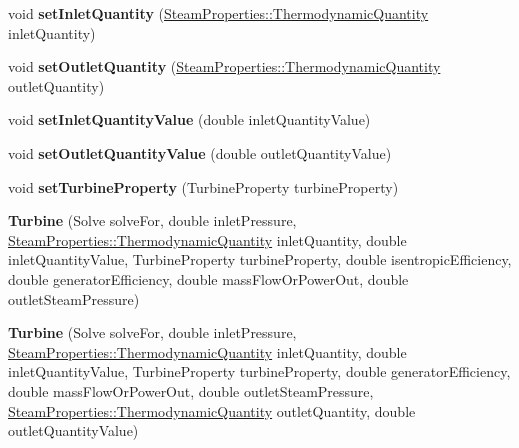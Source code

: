 \begin{DoxyCompactItemize}
\mbox{\label{class_turbine_aecc05c70870fb11bbc0bb4fe5d8438bd}} 
void {\bfseries set\+Inlet\+Quantity} (\hyperlink{class_steam_properties_ae0294bedf7d178c2d8fb6aed0f62fbff}{Steam\+Properties\+::\+Thermodynamic\+Quantity} inlet\+Quantity)
\item 
\mbox{\label{class_turbine_ad5ff4ba1657aac9519a6841336ec571c}} 
void {\bfseries set\+Outlet\+Quantity} (\hyperlink{class_steam_properties_ae0294bedf7d178c2d8fb6aed0f62fbff}{Steam\+Properties\+::\+Thermodynamic\+Quantity} outlet\+Quantity)
\item 
\mbox{\label{class_turbine_ac01a053462c83e21ecc2158e75477542}} 
void {\bfseries set\+Inlet\+Quantity\+Value} (double inlet\+Quantity\+Value)
\item 
\mbox{\label{class_turbine_ab37326068f633280de8f8144b9c8eb89}} 
void {\bfseries set\+Outlet\+Quantity\+Value} (double outlet\+Quantity\+Value)
\item 
\mbox{\label{class_turbine_abb3f16cefe52f4e9c7b32b2bb17a68ee}} 
void {\bfseries set\+Turbine\+Property} (Turbine\+Property turbine\+Property)
\item 
\mbox{\label{class_turbine_a3c3c871b9fe57d48dd06b109794381dc}} 
{\bfseries Turbine} (Solve solve\+For, double inlet\+Pressure, \hyperlink{class_steam_properties_ae0294bedf7d178c2d8fb6aed0f62fbff}{Steam\+Properties\+::\+Thermodynamic\+Quantity} inlet\+Quantity, double inlet\+Quantity\+Value, Turbine\+Property turbine\+Property, double isentropic\+Efficiency, double generator\+Efficiency, double mass\+Flow\+Or\+Power\+Out, double outlet\+Steam\+Pressure)
\item 
\mbox{\label{class_turbine_a1ec182906c075407882de542954d9030}} 
{\bfseries Turbine} (Solve solve\+For, double inlet\+Pressure, \hyperlink{class_steam_properties_ae0294bedf7d178c2d8fb6aed0f62fbff}{Steam\+Properties\+::\+Thermodynamic\+Quantity} inlet\+Quantity, double inlet\+Quantity\+Value, Turbine\+Property turbine\+Property, double generator\+Efficiency, double mass\+Flow\+Or\+Power\+Out, double outlet\+Steam\+Pressure, \hyperlink{class_steam_properties_ae0294bedf7d178c2d8fb6aed0f62fbff}{Steam\+Properties\+::\+Thermodynamic\+Quantity} outlet\+Quantity, double outlet\+Quantity\+Value)

\end{DoxyCompactItemize}
